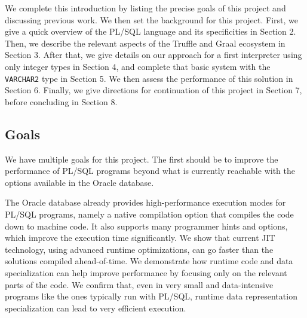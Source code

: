 \documentclass[twoside,11pt,a4paper]{article}
\newcommand{\pls}[1]{\texttt{#1}}
\newcommand{\plstype}[1]{\pls{#1}}
\newcommand{\varchar}{\plstype{VARCHAR2}}
\begin{document}
\vspace{1cm}

We complete this introduction by listing the precise goals of this project and discussing previous work. We then set the background for this project. First, we give a quick overview of the PL/SQL language and its specificities in Section 2. Then, we describe the relevant aspects of the Truffle and Graal ecosystem in Section 3. After that, we give details on our approach for a first interpreter using only integer types in Section 4, and complete that basic system with the \varchar{} type in Section 5. We then assess the performance of this solution in Section 6. Finally, we give directions for continuation of this project in Section 7, before concluding in Section 8.

\subsection{Goals}


We have multiple goals for this project. The first should be to improve the performance of PL/SQL programs beyond what is currently reachable with the options available in the Oracle database.

The Oracle database already provides high-performance execution modes for PL/SQL programs, namely a native compilation option that compiles the code down to machine code. It also supports many programmer hints and options, which improve the execution time significantly. We show that current JIT technology, using advanced runtime optimizations, can go faster than the solutions compiled ahead-of-time. We demonstrate how runtime code and data specialization can help improve performance by focusing only on the relevant parts of the code. We confirm that, even in very small and data-intensive programs like the ones typically run with PL/SQL, runtime data representation specialization can lead to very efficient execution.
\end{document}
